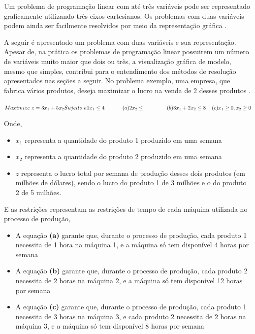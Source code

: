 Um problema de programação linear com até três variáveis pode ser representado graficamente utilizando três eixos cartesianos. Os problemas com duas variáveis podem ainda ser facilmente resolvidos por meio da representação gráfica \cite{Passos}. 

A seguir é apresentado um problema com duas variáveis e sua representação. Apesar de, na prática os problemas de programação linear possuirem um número de variáveis muito maior que dois ou três, a visualização gráfica de modelo, mesmo que simples, contribui para o entendimento dos métodos de resolução apresentados nas seções a seguir.
No problema exemplo, uma empresa, que fabrica vários produtos, deseja maximizar o lucro na venda de 2 desses produtos \cite{Hillier}.

$\\
Maximize\ z=3x_{1}+5x_{2}\\
Sujeito\ a \\
        1x_{1}\leq 4 \; \; \; \; \; \; \; \; \; \; \; \;(a)\\
        2x_{2}\leq \; \; \; \; \; \; \; \; \; \; \; \; \; \; \;(b)\\
        3x_{1}+2x_{2}\leq 8 \; \; \; \; (c)\\
        x_{1}\geq 0, x_{2}\geq 0 $

Onde, 
\begin{itemize}
\item \textbf {$x_{1}$} representa a quantidade do produto 1 produzido em uma semana
\item \textbf {$x_{2}$} representa a quantidade do produto 2 produzido em uma semana
\item \textbf {$z$} representa o lucro total por semana de produção desses dois produtos (em milhões de dólares), sendo o lucro do produto 1 de 3 milhões e o do produto 2 de 5 milhões.
\end{itemize}

E as restrições representam as restrições de tempo de cada máquina utilizada no processo de produção,
\begin{itemize}
\item A equação \textbf {(a)} garante que, durante o processo de produção, cada produto 1 necessita de 1 hora na máquina 1, e a máquina só tem disponível 4 horas por semana
\item A equação \textbf {(b)} garante que, durante o processo de produção, cada produto 2 necessita de 2 horas na máquina 2, e a máquina só tem disponível 12 horas por semana
\item A equação \textbf {(c)} garante que, durante o processo de produção, cada produto 1 necessita de 3 horas na máquina 3, e cada produto 2 necessita de 2 horas na máquina 3, e a máquina só tem disponível 8 horas por semana
\end{itemize}

